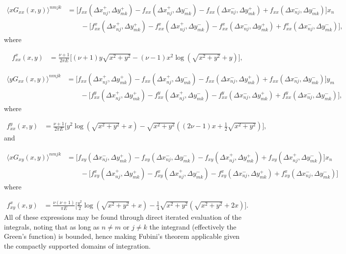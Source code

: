 \documentclass[aps,prl,reprint,twocolumn,groupedaddress,showpacs]{revtex4}
\begin{document}
\begin{widetext}
\begin{align}
\langle xG_{xx}(x,y) \rangle^{nmjk} & =\Big[f_{xx}(\Delta x_{nj}^+,\Delta y_{mk}^+)
- f_{xx}(\Delta x_{nj}^+,\Delta y_{mk}^-)
-f_{xx}(\Delta x_{nj}^-, \Delta y_{mk}^+)+ f_{xx}
(\Delta x_{nj}^- , \Delta y_{mk}^-)\Big] x_n\nonumber\\
\: &\qquad - \Big[ f^x_{xx}( \Delta x_{nj}^+ , \Delta y_{mk}^+)- 
f^x_{xx}(\Delta x_{nj}^+ , \Delta y_{mk}^-)-
f^x_{xx}(\Delta x_{nj}^-, \Delta y_{mk}^+) + f^x_{xx}(\Delta x_{nj}^- , \Delta y_{mk}^-)\Big],
\end{align}
%
where

\begin{align}
f^x_{xx}(x,y) &= \frac{\nu+1}{2\pi E} \Big[ (\nu+1)y\sqrt{x^2 + y^2}
- (\nu-1) x^2\log\left(\sqrt{x^2 + y^2} +y  \right)  \Big],\label{eq:fxxx}
\end{align}

\begin{align}
\langle yG_{xx}(x,y) \rangle^{nmjk} & = 
\Big[f_{xx}(\Delta x_{nj}^{+},\Delta y_{mk}^+)-f_{xx}(\Delta x_{nj}^+,\Delta y_{mk}^-)
-f_{xx}(\Delta x_{nj}^{-}, \Delta y_{mk}^+) + 
f_{xx}(\Delta x_{nj}^{-}, \Delta y_{mk}^-)\Big] y_m\nonumber\\
\: &\qquad - \Big[ f^y_{xx}(\Delta x_{nj}^+,\Delta y_{mk}^+) 
- f^y_{xx}(\Delta x_{nj}^+,\Delta y_{mk}^-)
- f^y_{xx}(\Delta x_{nj}^-,\Delta y_{mk}^+) 
+ f^y_{xx}(\Delta x_{nj}^-,\Delta y_{mk}^-)\Big],
\end{align}
%
where

\begin{align}
f^y_{xx}(x,y) &=\frac{\nu+1}{2\pi E} \Bigg[y^2\log\left(\sqrt{x^2+y^2}+x \right)
-\sqrt{x^2+y^2}\left((2\nu-1)x + \frac{1}{2}\sqrt{x^2+y^2} \right)  \Bigg], \label{eq:fyxx}
\end{align}
%
and

\begin{align}
\langle xG_{xy}(x,y)\rangle^{nmjk} & = 
\Big[f_{xy}(\Delta x_{nj}^{-},\Delta y_{mk}^+)-f_{xy}(\Delta x_{nj}^{-},\Delta y_{mk}^-)
- f_{xy}(\Delta x_{nj}^{+},\Delta y_{mk}^+) + f_{xy}(\Delta x_{nj}^+,\Delta y_{mk}^-) \Big]x_n \nonumber\\
\: & \qquad -\Big[f_{xy}^x(\Delta x_{nj}^{+},\Delta y_{mk}^+) - f_{xy}^x(\Delta x_{nj}^{+},\Delta y_{mk}^-)
-f_{xy}^x(\Delta x_{nj}^{-},\Delta y_{mk}^+)+f_{xy}^x(\Delta x_{nj}^{-},\Delta y_{mk}^-)\Big]
\end{align}
%
where

\begin{align}
f_{xy}^x(x,y) &=\frac{\nu(\nu+1)}{\pi E}\Big[ \frac{y^2}{2}\log\left(\sqrt{x^2+y^2} +x\right)
-\frac{1}{4}\sqrt{x^2+y^2}\left(\sqrt{x^2+y^2}+2x\right) \Big]. \label{eq:fxxy}
\end{align}
All of these expressions may be found through direct iterated
evaluation of the integrals, noting that as long as $n\neq m$ or
$j\neq k$ the integrand (effectively the Green's function) is bounded,
hence making Fubini's theorem applicable given the compactly supported
domains of integration.


\end{widetext}
\end{document}
